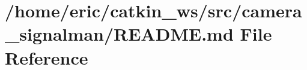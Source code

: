 \hypertarget{camera__signalman_2README_8md}{}\section{/home/eric/catkin\+\_\+ws/src/camera\+\_\+signalman/\+R\+E\+A\+D\+ME.md File Reference}
\label{camera__signalman_2README_8md}
